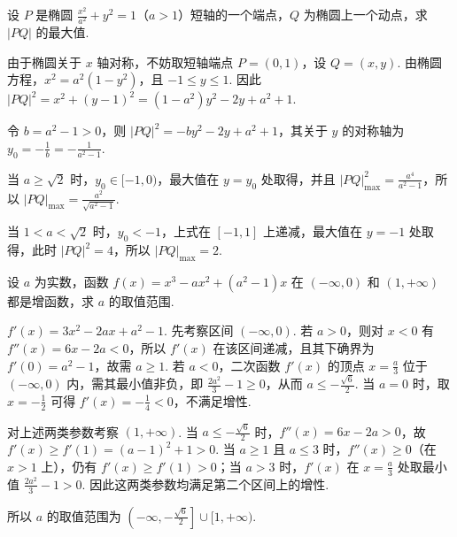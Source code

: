 \begin{problem}
设 \(P\) 是椭圆 \(\frac{x^2}{a^2} + y^2 = 1\)（\(a > 1\)）短轴的一个端点，\(Q\) 为椭圆上一个动点，求 \(|PQ|\) 的最大值.
\end{problem}

\begin{solution}
由于椭圆关于 \(x\) 轴对称，不妨取短轴端点 \(P=(0,1)\)，设 \(Q=(x,y)\). 由椭圆方程，\(x^{2}=a^{2}\left(1-y^{2}\right)\)，且 \(-1\leqslant y\leqslant1\). 因此
\(|PQ|^{2}=x^{2}+(y-1)^{2}=(1-a^{2})y^{2}-2y+a^{2}+1\).

令 \(b=a^{2}-1>0\)，则 \(|PQ|^{2}=-by^{2}-2y+a^{2}+1\)，其关于 \(y\) 的对称轴为 \(y_{0}=-\frac{1}{b}=-\frac{1}{a^{2}-1}\).

当 \(a\geqslant\sqrt{2}\) 时，\(y_{0}\in[-1,0)\)，最大值在 \(y=y_{0}\) 处取得，并且
\(|PQ|^{2}_{\max}=\frac{a^{4}}{a^{2}-1}\)，所以 \(|PQ|_{\max}=\frac{a^{2}}{\sqrt{a^{2}-1}}\).

当 \(1<a<\sqrt{2}\) 时，\(y_{0}<-1\)，上式在 \([-1,1]\) 上递减，最大值在 \(y=-1\) 处取得，此时 \(|PQ|^{2}=4\)，所以 \(|PQ|_{\max}=2\).
\end{solution}

\begin{problem}
设 \(a\) 为实数，函数 \(f(x) = x^{3} - ax^{2} + (a^{2} - 1)x\) 在 \((- \infty, 0)\) 和 \((1, +\infty)\) 都是增函数，求 \(a\) 的取值范围.
\end{problem}

\begin{solution}
\(f'(x)=3x^{2}-2ax+a^{2}-1\). 先考察区间 \((-\infty,0)\). 若 \(a>0\)，则对 \(x<0\) 有 \(f''(x)=6x-2a<0\)，所以 \(f'(x)\) 在该区间递减，且其下确界为 \(f'(0)=a^{2}-1\)，故需 \(a\geqslant1\). 若 \(a<0\)，二次函数 \(f'(x)\) 的顶点 \(x=\frac{a}{3}\) 位于 \((-\infty,0)\) 内，需其最小值非负，即 \(\frac{2a^{2}}{3}-1\geqslant0\)，从而 \(a\leqslant-\frac{\sqrt{6}}{2}\). 当 \(a=0\) 时，取 \(x=-\frac{1}{2}\) 可得 \(f'(x)=-\frac{1}{4}<0\)，不满足增性.

对上述两类参数考察 \((1,+\infty)\). 当 \(a\leqslant-\frac{\sqrt{6}}{2}\) 时，\(f''(x)=6x-2a>0\)，故 \(f'(x)\geqslant f'(1)=(a-1)^{2}+1>0\). 当 \(a\geqslant1\) 且 \(a\leqslant3\) 时，\(f''(x)\geqslant0\)（在 \(x>1\) 上），仍有 \(f'(x)\geqslant f'(1)>0\)；当 \(a>3\) 时，\(f'(x)\) 在 \(x=\frac{a}{3}\) 处取最小值 \(\frac{2a^{2}}{3}-1>0\). 因此这两类参数均满足第二个区间上的增性.

所以 \(a\) 的取值范围为 \(\left(-\infty,-\frac{\sqrt{6}}{2}\right]\cup[1,+\infty)\).
\end{solution}

